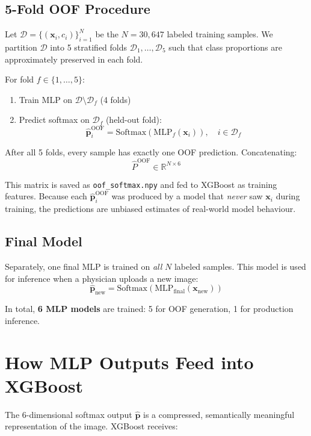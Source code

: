 \documentclass[12pt]{article}
\begin{document}
\subsection{5-Fold OOF Procedure}

Let $\mathcal{D} = \{(\bm{x}_i, c_i)\}_{i=1}^{N}$ be the $N = 30{,}647$
labeled training samples. We partition $\mathcal{D}$ into 5 stratified folds
$\mathcal{D}_1, \ldots, \mathcal{D}_5$ such that class proportions are
approximately preserved in each fold.

\medskip
\noindent For fold $f \in \{1,\ldots,5\}$:
\begin{enumerate}
    \item Train MLP on $\mathcal{D} \setminus \mathcal{D}_f$ (4 folds)
    \item Predict softmax on $\mathcal{D}_f$ (held-out fold):
    \[
    \hat{\bm{p}}_i^{\text{OOF}} = \text{Softmax}\!\left(\text{MLP}_f(\bm{x}_i)\right),
    \quad i \in \mathcal{D}_f
    \]
\end{enumerate}

After all 5 folds, every sample has exactly one OOF prediction. Concatenating:
\[
\hat{P}^{\text{OOF}} \in \mathbb{R}^{N \times 6}
\]

This matrix is saved as \texttt{oof\_softmax.npy} and fed to XGBoost as
training features. Because each $\hat{\bm{p}}_i^{\text{OOF}}$ was produced
by a model that \textit{never} saw $\bm{x}_i$ during training, the predictions
are unbiased estimates of real-world model behaviour.

\subsection{Final Model}

Separately, one final MLP is trained on \textit{all} $N$ labeled samples.
This model is used for inference when a physician uploads a new image:
\[
\hat{\bm{p}}_{\text{new}} = \text{Softmax}\!\left(\text{MLP}_{\text{final}}(\bm{x}_{\text{new}})\right)
\]

\medskip
\noindent In total, \textbf{6 MLP models} are trained: 5 for OOF generation,
1 for production inference.

\section{How MLP Outputs Feed into XGBoost}

The 6-dimensional softmax output $\hat{\bm{p}}$ is a compressed,
semantically meaningful representation of the image. XGBoost receives:
\end{document}
